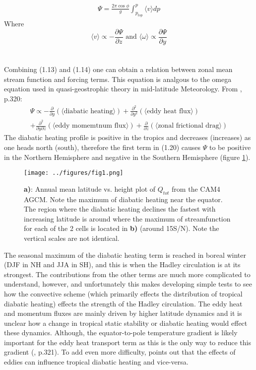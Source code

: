 \documentclass[letterpaper,12pt,titlepage,oneside,final]{book}
\begin{document}
\begin{align}
\Psi=\frac{2\pi\cos{\phi}}{g}\int_{p_{top}}^{p} \langle{v}\rangle{dp}
\end{align}
Where
\begin{equation}\label{eq:test}
\langle{v}\rangle \propto -\frac{\partial{\Psi}}{\partial{z}} \text{ and } \langle{\omega}\rangle \propto\frac{\partial{\Psi}}{\partial{y}}
\end{equation}
\\
\\
Combining (1.13) and (1.14) one can obtain a relation between zonal mean stream function and forcing terms. This equation is analgous to the omega equation used in quasi-geostrophic theory in mid-latitude Meteorology. From \citep{holton_introduction_2004}, p.320:
\begin{equation}
\begin{split}
\Psi \propto -\frac{\partial}{\partial{y}}(\langle\text{diabatic heating}\rangle) + \frac{\partial^{2}}{\partial{y^{2}}}(\langle\text{eddy heat flux}\rangle) \\ + \frac{\partial^{2}}{\partial{y}\partial{z}}(\langle\text{eddy momemtnum flux}\rangle) + \frac{\partial}{\partial{z}}(\langle\text{zonal frictional drag}\rangle) 
\end{split}
\end{equation}
The diabatic heating profile is positive in the tropics and decreases (increases) as one heads north (south), therefore the first term in (1.20) causes $\Psi$ to be positive in the Northern Hemisphere and negative in the Southern Hemisphere (figure \ref{fig:HC}).

\begin{figure}[H]
\centering
\noindent\texttt{[image: ../figures/fig1.png]}\hfill
\caption{\textbf{a)}: Annual mean latitude vs. height plot of $Q_{tot}$ from the CAM4 AGCM. Note the maximum of diabatic heating near the equator. The region where the diabatic heating declines the fastest with increasing latitude is around where the maximum of streamfunction for each of the 2 cells is located in \textbf{b)} (around 15S/N). Note the vertical scales are not identical.}
\label{fig:HC}
\end{figure}

The seasonal maximum of the diabatic heating term is reached in boreal winter (DJF in NH and JJA in SH), and this is when the Hadley circulation is at its strongest. The contributions from the other terms are much more complicated to understand, however, and unfortunately this makes developing simple tests to see how the convective scheme (which primarily effects the distribution of tropical diabatic heating) effects the strength of the Hadley circulation. The eddy heat and momentum fluxes are mainly driven by higher latitude dynamics and it is unclear how a change in tropical static stability or diabatic heating would effect these dynamics. Although, the equator-to-pole temperature gradient is likely important for the eddy heat transport term as this is the only way to reduce this gradient (\citep{holton_introduction_2004}, p.321). To add even more difficulty, \citep{kim_hadley_2001} points out that the effects of eddies can influence tropical diabatic heating and vice-versa.
\end{document}
